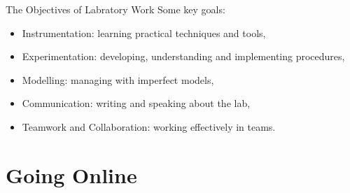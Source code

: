 \documentclass{beamer}
\begin{document}
\begin{frame}{The Objectives of Labratory Work}
  Some key goals:~\cite{Feisel2005}
  \begin{itemize}
    \item{
      Instrumentation: learning practical techniques and tools,
    } \pause
    \item{
      Experimentation: developing, understanding and implementing procedures,
    } \pause
    \item{
      Modelling: managing with imperfect models,
    } \pause
    \item{
      Communication: writing and speaking about the lab,
    } \pause
    \item{
      Teamwork and Collaboration: working effectively in teams.
    }
  \end{itemize}
\end{frame}

\section{Going Online}

\end{document}

